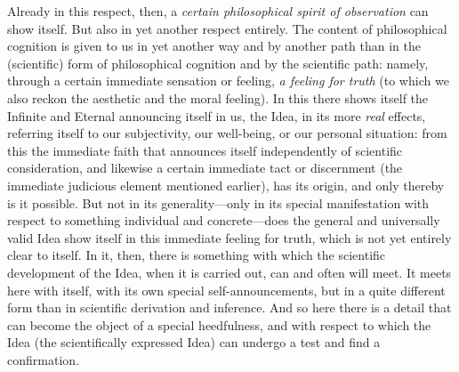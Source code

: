 \documentclass[12pt,a4paper]{book}
\begin{document}
Already in this respect, then, a \emph{certain philosophical spirit of observation} can show
itself. But also in yet another respect entirely. The content of philosophical cognition is
given to us in yet another way and by another path than in the (scientific) form of
philosophical cognition and by the scientific path: namely, through a certain immediate
sensation or feeling, \emph{a feeling for truth} (to which we also reckon the aesthetic and
the moral feeling). In this there shows itself the Infinite and Eternal announcing itself in
us, the Idea, in its more \emph{real} effects, referring itself to our subjectivity, our
well-being, or our personal situation: from this the immediate faith that announces itself
independently of scientific consideration, and likewise a certain immediate tact or
discernment (the immediate judicious element mentioned earlier), has its origin, and only
thereby is it possible. But not in its generality---only in its special manifestation with
respect to something individual and concrete---does the general and universally valid Idea
show itself in this immediate feeling for truth, which is not yet entirely clear to itself.
In it, then, there is something with which the scientific development of the Idea, when it is
carried out, can and often will meet. It meets here with itself, with its own special
self-announcements, but in a quite different form than in scientific derivation and
inference. And so here there is a detail that can become the object of a special
heedfulness, and with respect to which the Idea (the scientifically expressed Idea) can
undergo a test and find a confirmation.
\end{document}
